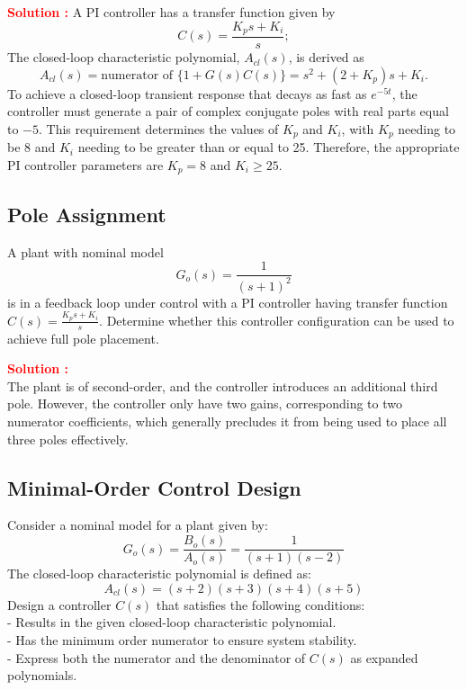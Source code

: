 \documentclass[12pt]{article}
\begin{document}
\textbf{\textcolor{red}{Solution :}}
A PI controller has a transfer function given by
\begin{equation}
C(s) = \frac{K_ps + K_i}{s};
\end{equation}
The closed-loop characteristic polynomial, \(A_{cl}(s)\), is derived as
\begin{equation}
A_{cl}(s) = \text{numerator of } \{1 + G(s)C(s)\} = s^2 + (2 + K_p)s + K_i.
\end{equation}
To achieve a closed-loop transient response that decays as fast as \(e^{-5t}\), the controller must generate a pair of complex conjugate poles with real parts equal to \(-5\). This requirement determines the values of \(K_p\) and \(K_i\), with \(K_p\) needing to be 8 and \(K_i\) needing to be greater than or equal to 25. Therefore, the appropriate PI controller parameters are \(K_p = 8\) and \(K_i \geq 25\).

\clearpage
\subsection{Pole Assignment}

A plant with nominal model 
\begin{equation}
    G_o(s) = \frac{1}{(s + 1)^2}
\end{equation}
is in a feedback loop under control with a PI controller having transfer function $C(s) = \frac{K_ps + K_i}{s}$.
Determine whether this controller configuration can be used to achieve full pole placement.

\textbf{\textcolor{red}{Solution :}} \\ 
The plant is of second-order, and the controller introduces an additional third pole. However, the controller only have two gains, corresponding to two numerator coefficients, which generally precludes it from being used to place all three poles effectively.
\clearpage
\subsection{Minimal-Order Control Design}

Consider a nominal model for a plant given by:
\begin{equation}
G_o(s) = \frac{B_o(s)}{A_o(s)}=\frac{1}{(s + 1)(s - 2)}
\end{equation}
The closed-loop characteristic polynomial is defined as:
\begin{equation}
A_{cl}(s) = (s + 2)(s + 3)(s + 4)(s + 5)
\end{equation}
Design a controller \(C(s)\) that satisfies the following conditions:\\
- Results in the given closed-loop characteristic polynomial.\\
- Has the minimum order numerator to ensure system stability.\\
- Express both the numerator and the denominator of \(C(s)\) as expanded polynomials.\\
\end{document}
